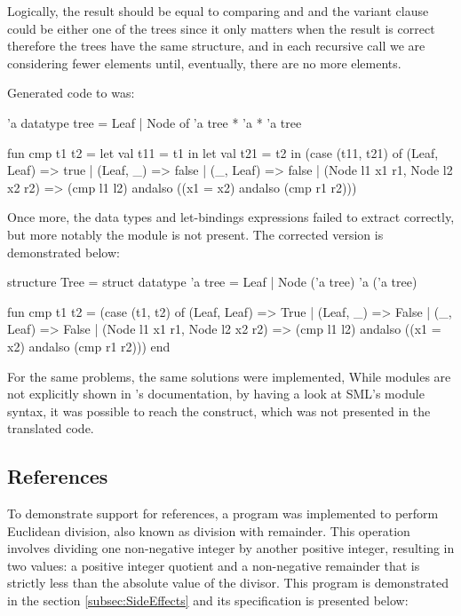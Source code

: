 Logically, the result should be equal to comparing  and  and the variant clause could be either one of 
the trees since it only matters when the result is correct therefore the trees have the same structure, and in each recursive call we
are considering fewer elements until, eventually, there are no more elements.

Generated code to \cml was:

\begin{cakeml}
'a datatype tree = Leaf | Node of 'a tree * 'a * 'a tree

fun cmp t1 t2 = let val t11 = t1 in
  let val t21 = t2 in
  (case (t11, t21) of
    (Leaf, Leaf) => true
  | (Leaf, _) => false
  | (_, Leaf) => false
  | (Node l1 x1 r1, Node l2 x2 r2) =>
    (cmp l1 l2) andalso ((x1 = x2) andalso (cmp r1 r2)))
\end{cakeml}

Once more, the data types and let-bindings expressions failed to extract correctly, but more notably the module is not present.
The corrected version is demonstrated below:

\begin{cakeml}
structure Tree = struct
  datatype 'a tree = Leaf | Node ('a tree) 'a ('a tree)

  fun cmp t1 t2 =
  (case (t1, t2) of
    (Leaf, Leaf) => True
  | (Leaf, _) => False
  | (_, Leaf) => False
  | (Node l1 x1 r1, Node l2 x2 r2) =>
      (cmp l1 l2) andalso ((x1 = x2) andalso (cmp r1 r2)))
end
\end{cakeml}

For the same problems, the same solutions were implemented, While modules are not explicitly shown
in \cml's documentation, by having a look at SML's module syntax, it was possible to reach the 
 construct, which was not presented in the translated code.

\subsection{References}

To demonstrate support for references, a program was implemented to perform Euclidean division, also known as division with remainder. 
This operation involves dividing one non-negative integer by another positive integer, resulting in two values: a positive integer 
quotient and a non-negative remainder that is strictly less than the absolute value of the divisor. This program is demonstrated 
in the section \ref{subsec:SideEffects} and its specification is presented below:

